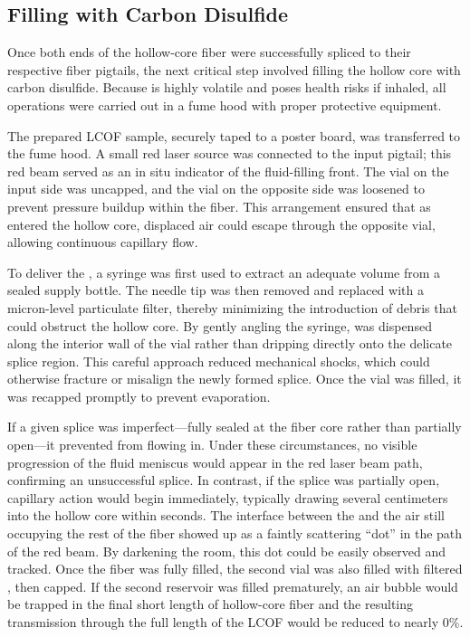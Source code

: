 \subsection{Filling with Carbon Disulfide}
\label{Cooling:Appendix:subsec:Filling with CS2}

Once both ends of the hollow-core fiber were successfully spliced to their respective fiber pigtails, the next critical step involved filling the hollow core with carbon disulfide. Because  is highly volatile and poses health risks if inhaled, all operations were carried out in a fume hood with proper protective equipment.

The prepared \ac{LCOF} sample, securely taped to a poster board, was transferred to the fume hood. A small red laser source was connected to the input pigtail; this red beam served as an in situ indicator of the fluid-filling front. The vial on the input side was uncapped, and the vial on the opposite side was loosened to prevent pressure buildup within the fiber. This arrangement ensured that as  entered the hollow core, displaced air could escape through the opposite vial, allowing continuous capillary flow.

To deliver the , a syringe was first used to extract an adequate volume from a sealed supply bottle. The needle tip was then removed and replaced with a micron-level particulate filter, thereby minimizing the introduction of debris that could obstruct the hollow core. By gently angling the syringe,  was dispensed along the interior wall of the vial rather than dripping directly onto the delicate splice region. This careful approach reduced mechanical shocks, which could otherwise fracture or misalign the newly formed splice. Once the vial was filled, it was recapped promptly to prevent evaporation.

If a given splice was imperfect—fully sealed at the fiber core rather than partially open—it prevented  from flowing in. Under these circumstances, no visible progression of the fluid meniscus would appear in the red laser beam path, confirming an unsuccessful splice. In contrast, if the splice was partially open, capillary action would begin immediately, typically drawing  several centimeters into the hollow core within seconds. The interface between the  and the air still occupying the rest of the fiber showed up as a faintly scattering “dot” in the path of the red beam. By darkening the room, this dot could be easily observed and tracked. Once the fiber was fully filled, the second vial was also filled with filtered , then capped. If the second reservoir was filled prematurely, an air bubble would be trapped in the final short length of hollow-core fiber and the resulting transmission through the full length of the \ac{LCOF} would be reduced to nearly 0\%.

